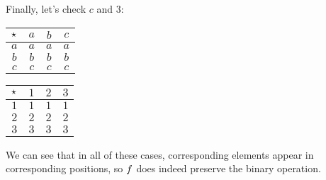 \documentclass[../../../main.tex]{subfiles}
\begin{document}
\begin{fexample}
Finally, let's check $c$ and $3$:

\begin{center}
  \begin{tabular}{| c || c | c | c | }
    \hline
    $\opSymbol/$ & $a$ & $b$ & \cellcolor{grey3} $c$ \\ \hline \hline
    $a$          & $a$ & $a$ & $a$ \\ \hline
    $b$          & $b$ & $b$ & $b$ \\ \hline
    \cellcolor{grey3} $c$          & \cellcolor{grey3} $c$ & \cellcolor{grey3} $c$ & \cellcolor{grey3} $c$ \\ \hline
  \end{tabular}
  \hskip 2cm
  \begin{tabular}{| c || c | c | c | }
    \hline
    $\opSymbol/$ & $1$ & $2$ & \cellcolor{grey3} $3$ \\ \hline \hline
    $1$          & $1$ & $1$ & $1$ \\ \hline
    $2$          & $2$ & $2$ & $2$ \\ \hline
    \cellcolor{grey3} $3$          & \cellcolor{grey3} $3$ & \cellcolor{grey3} $3$ & \cellcolor{grey3} $3$ \\ \hline
  \end{tabular}
\end{center}

We can see that in all of these cases, corresponding elements appear in corresponding positions, so $f$ does indeed preserve the binary operation.

\end{fexample}
\end{document}
